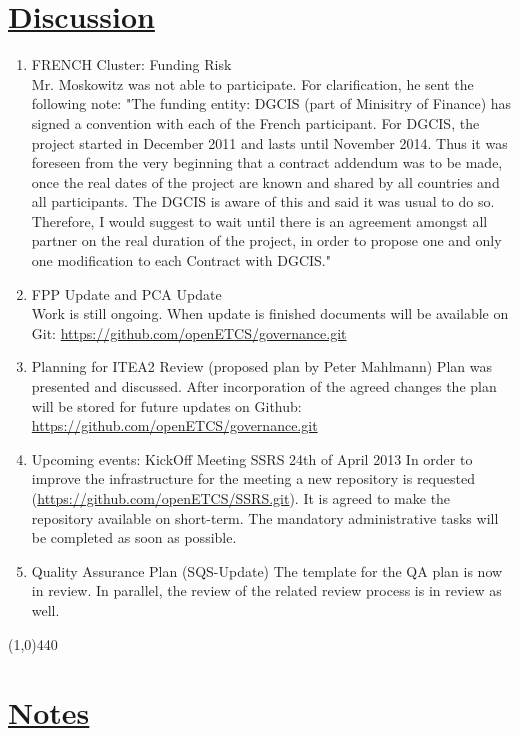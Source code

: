\documentclass[a4paper]{article}
\begin{document}
\section*{\underline{Discussion}}
\begin{enumerate}
\item FRENCH Cluster: Funding Risk\\
Mr. Moskowitz was not able to participate. For clarification, he sent the following note: "The funding entity: DGCIS (part of Minisitry of Finance) has signed a convention with each of the French participant. For DGCIS, the project started in December 2011 and lasts until November 2014. Thus it was foreseen from the very beginning that a contract addendum was to be made, once the real dates of the project are known and shared by all countries and all participants. The DGCIS is aware of this and said it was usual to do so.\\
Therefore, I would suggest to wait until there is an agreement amongst all partner on the real duration of the project, in order to propose one and only one modification to each Contract with DGCIS."
\item FPP Update and PCA Update\\
Work is still ongoing. When update is finished documents will be available on Git: \url{https://github.com/openETCS/governance.git}
\item Planning for ITEA2 Review (proposed plan by Peter Mahlmann)
Plan was presented and discussed. After incorporation of the agreed changes the plan will be stored for future updates on Github: \url{https://github.com/openETCS/governance.git}
\item Upcoming events: KickOff Meeting SSRS 24th of April 2013
In order to improve the infrastructure for the meeting a new repository is requested (\url{https://github.com/openETCS/SSRS.git}). It is agreed to make the repository available on short-term. The mandatory administrative tasks will be completed as soon as possible.
\item Quality Assurance Plan (SQS-Update)
The template for the QA plan is now in review. In parallel, the review of the related review process is in review as well.
\end{enumerate}

\line(1,0){440}
\section*{\underline{Notes}}
\end{document}
